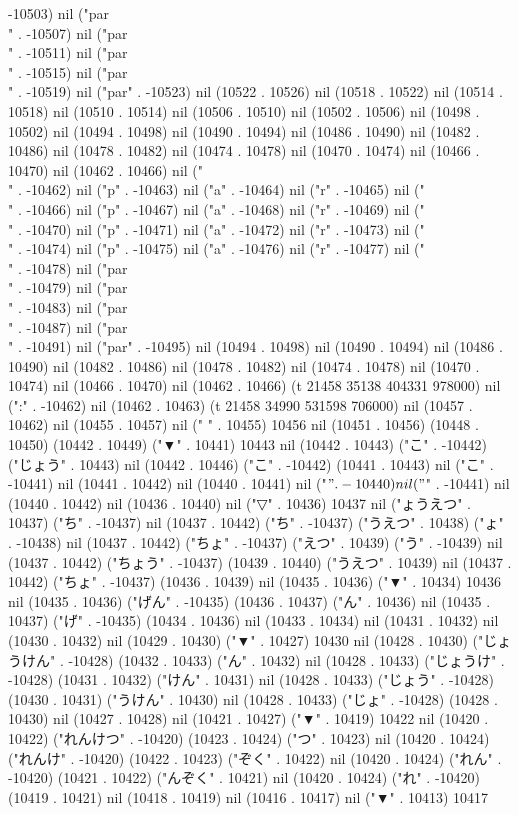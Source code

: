 -10503) nil ("par\\" . -10507) nil ("par\\" . -10511) nil ("par\\" . -10515) nil ("par\\" . -10519) nil ("par" . -10523) nil (10522 . 10526) nil (10518 . 10522) nil (10514 . 10518) nil (10510 . 10514) nil (10506 . 10510) nil (10502 . 10506) nil (10498 . 10502) nil (10494 . 10498) nil (10490 . 10494) nil (10486 . 10490) nil (10482 . 10486) nil (10478 . 10482) nil (10474 . 10478) nil (10470 . 10474) nil (10466 . 10470) nil (10462 . 10466) nil ("\\" . -10462) nil ("p" . -10463) nil ("a" . -10464) nil ("r" . -10465) nil ("\\" . -10466) nil ("p" . -10467) nil ("a" . -10468) nil ("r" . -10469) nil ("\\" . -10470) nil ("p" . -10471) nil ("a" . -10472) nil ("r" . -10473) nil ("\\" . -10474) nil ("p" . -10475) nil ("a" . -10476) nil ("r" . -10477) nil ("\\" . -10478) nil ("par\\" . -10479) nil ("par\\" . -10483) nil ("par\\" . -10487) nil ("par\\" . -10491) nil ("par" . -10495) nil (10494 . 10498) nil (10490 . 10494) nil (10486 . 10490) nil (10482 . 10486) nil (10478 . 10482) nil (10474 . 10478) nil (10470 . 10474) nil (10466 . 10470) nil (10462 . 10466) (t 21458 35138 404331 978000) nil (":" . -10462) nil (10462 . 10463) (t 21458 34990 531598 706000) nil (10457 . 10462) nil (10455 . 10457) nil (" " . 10455) 10456 nil (10451 . 10456) (10448 . 10450) (10442 . 10449) ("▼" . 10441) 10443 nil (10442 . 10443) ("こ" . -10442) ("じょう" . 10443) nil (10442 . 10446) ("こ" . -10442) (10441 . 10443) nil ("こ" . -10441) nil (10441 . 10442) nil (10440 . 10441) nil ("$" . -10440) nil ("$" . -10441) nil (10440 . 10442) nil (10436 . 10440) nil ("▽" . 10436) 10437 nil ("ょうえつ" . 10437) ("ち" . -10437) nil (10437 . 10442) ("ち" . -10437) ("うえつ" . 10438) ("ょ" . -10438) nil (10437 . 10442) ("ちょ" . -10437) ("えつ" . 10439) ("う" . -10439) nil (10437 . 10442) ("ちょう" . -10437) (10439 . 10440) ("うえつ" . 10439) nil (10437 . 10442) ("ちょ" . -10437) (10436 . 10439) nil (10435 . 10436) ("▼" . 10434) 10436 nil (10435 . 10436) ("げん" . -10435) (10436 . 10437) ("ん" . 10436) nil (10435 . 10437) ("げ" . -10435) (10434 . 10436) nil (10433 . 10434) nil (10431 . 10432) nil (10430 . 10432) nil (10429 . 10430) ("▼" . 10427) 10430 nil (10428 . 10430) ("じょうけん" . -10428) (10432 . 10433) ("ん" . 10432) nil (10428 . 10433) ("じょうけ" . -10428) (10431 . 10432) ("けん" . 10431) nil (10428 . 10433) ("じょう" . -10428) (10430 . 10431) ("うけん" . 10430) nil (10428 . 10433) ("じょ" . -10428) (10428 . 10430) nil (10427 . 10428) nil (10421 . 10427) ("▼" . 10419) 10422 nil (10420 . 10422) ("れんけつ" . -10420) (10423 . 10424) ("つ" . 10423) nil (10420 . 10424) ("れんけ" . -10420) (10422 . 10423) ("ぞく" . 10422) nil (10420 . 10424) ("れん" . -10420) (10421 . 10422) ("んぞく" . 10421) nil (10420 . 10424) ("れ" . -10420) (10419 . 10421) nil (10418 . 10419) nil (10416 . 10417) nil ("▼" . 10413) 10417 
